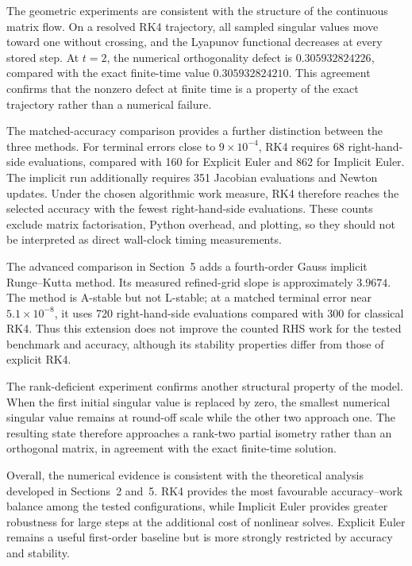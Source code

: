 The geometric experiments are consistent with the structure of the
continuous matrix flow. On a resolved RK4 trajectory, all sampled
singular values move toward one without crossing, and the Lyapunov
functional decreases at every stored step. At $t=2$, the numerical
orthogonality defect is
$0.305932824226$, compared with the exact finite-time value
$0.305932824210$. This agreement confirms that the nonzero defect at
finite time is a property of the exact trajectory rather than a
numerical failure.

The matched-accuracy comparison provides a further distinction between
the three methods. For terminal errors close to $9\times10^{-4}$, RK4
requires 68 right-hand-side evaluations, compared with 160 for Explicit
Euler and 862 for Implicit Euler. The implicit run additionally requires
351 Jacobian evaluations and Newton updates. Under the chosen
algorithmic work measure, RK4 therefore reaches the selected accuracy
with the fewest right-hand-side evaluations. These counts exclude matrix
factorisation, Python overhead, and plotting, so they should not be
interpreted as direct wall-clock timing measurements.

The advanced comparison in Section~5 adds a fourth-order Gauss implicit
Runge--Kutta method. Its measured refined-grid slope is approximately
$3.9674$. The method is A-stable but not L-stable; at a matched terminal
error near $5.1\times10^{-8}$, it uses 720 right-hand-side evaluations
compared with 300 for classical RK4. Thus this extension does not improve
the counted RHS work for the tested benchmark and accuracy, although its
stability properties differ from those of explicit RK4.

The rank-deficient experiment confirms another structural property of
the model. When the first initial singular value is replaced by zero,
the smallest numerical singular value remains at round-off scale while
the other two approach one. The resulting state therefore approaches a
rank-two partial isometry rather than an orthogonal matrix, in agreement
with the exact finite-time solution.

Overall, the numerical evidence is consistent with the theoretical
analysis developed in Sections~2 and~5. RK4 provides the most favourable
accuracy--work balance among the tested configurations, while Implicit
Euler provides greater robustness for large steps at the additional
cost of nonlinear solves. Explicit Euler remains a useful first-order
baseline but is more strongly restricted by accuracy and stability.

